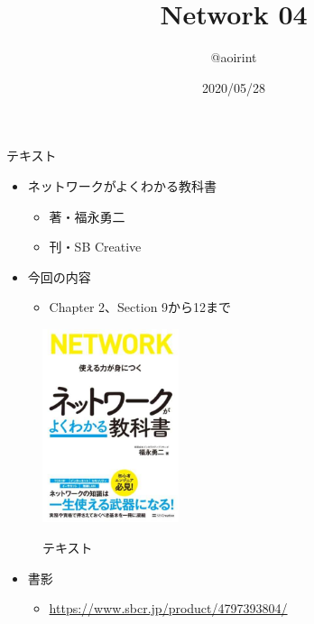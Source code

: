 \documentclass[12pt,aspectratio=169]{beamer}
\title{Network 04}
\author{@aoirint}
\date{2020/05/28}
\begin{document}
\frame{\maketitle}

\begin{frame}{テキスト}

  \begin{minipage}{0.58\textwidth}
    \begin{itemize}
      \item ネットワークがよくわかる教科書
      \begin{itemize}
        \item 著・福永勇二
        \item 刊・SB Creative
      \end{itemize}
      \item 今回の内容
        \begin{itemize}
          \item Chapter 2、Section 9から12まで
        \end{itemize}

    \end{itemize}

  \end{minipage}
  \hfill
  \begin{minipage}{0.38\textwidth}
    \vspace{-1\baselineskip}
    \begin{figure}[h]
      \centering
      \includegraphics[width=4cm,bb=0 0 420 596]{../02/figures/networkbook.jpg}
      \label{fig:networkbook}
      \caption{テキスト}
    \end{figure}
  \end{minipage}

  \begin{itemize}
    \item 書影
    \begin{itemize}
      \item { \small \url{https://www.sbcr.jp/product/4797393804/} }
    \end{itemize}
  \end{itemize}

\end{frame}
\end{document}
